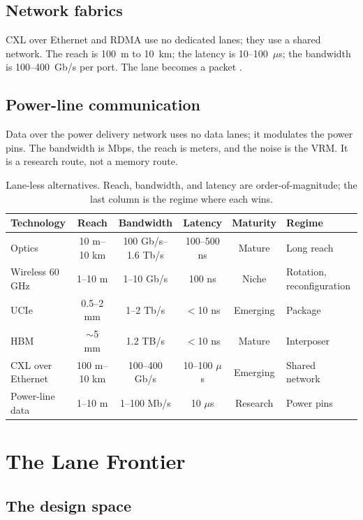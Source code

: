 \documentclass[10pt,letterpaper]{article}
\begin{document}
\subsection{Network fabrics}

CXL over Ethernet and RDMA use no dedicated lanes; they use a shared network. The reach is 100~m to 10~km; the latency is 10--100~$\mu$s; the bandwidth is 100--400~Gb/s per port. The lane becomes a packet \cite{cxl}.

\subsection{Power-line communication}

Data over the power delivery network uses no data lanes; it modulates the power pins. The bandwidth is Mbps, the reach is meters, and the noise is the VRM. It is a research route, not a memory route.

\begin{table}[t]
\centering
\caption{Lane-less alternatives. Reach, bandwidth, and latency are order-of-magnitude; the last column is the regime where each wins.}
\label{tab:laneless}
\small
\begin{tabularx}{\linewidth}{@{}lccccX@{}}
\toprule
Technology & Reach & Bandwidth & Latency & Maturity & Regime \\
\midrule
Optics & 10 m--10 km & 100 Gb/s--1.6 Tb/s & 100--500 ns & Mature & Long reach \\
Wireless 60 GHz & 1--10 m & 1--10 Gb/s & 100 ns & Niche & Rotation, reconfiguration \\
UCIe & 0.5--2 mm & 1--2 Tb/s & $<$10 ns & Emerging & Package \\
HBM & $\sim$5 mm & 1.2 TB/s & $<$10 ns & Mature & Interposer \\
CXL over Ethernet & 100 m--10 km & 100--400 Gb/s & 10--100 $\mu$s & Emerging & Shared network \\
Power-line data & 1--10 m & 1--100 Mb/s & 10 $\mu$s & Research & Power pins \\
\bottomrule
\end{tabularx}
\end{table}

\section{The Lane Frontier}
\label{sec:frontier}

\subsection{The design space}
\end{document}
